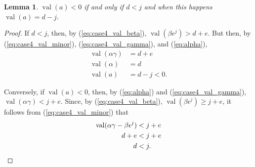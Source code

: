 \documentclass{amsart}
\newtheorem{lemma}{Lemma}[subsection]
\theoremstyle{definition}
\def\e{\epsilon}
\def\val{\mathop{\mathrm{val}}}
\begin{document}
  \begin{lemma}
    \label{lemma:case4_val_a}
    $\val(a) < 0$ if and only if $d < j$ and when this happens $\val(a) = d -
    j$.
  \end{lemma}
  \begin{proof}
    If $d < j$, then, by (\ref{eq:case4_val_beta}), $\val(\beta e^j) > d + e$.
    But then, by (\ref{eq:case4_val_minor}), (\ref{eq:case4_val_gamma}), and
    (\ref{eq:alpha}),
    \begin{align*}
      \val(\alpha\gamma) &= d + e \\
      \val(\alpha) &= d \\
      \val(a) &= d - j < 0.
    \end{align*}

    Conversely, if $\val(a) < 0$, then, by (\ref{eq:alpha}) and
    (\ref{eq:case4_val_gamma}), $\val(\alpha\gamma) < j + e$.  Since, by
    (\ref{eq:case4_val_beta}), $\val(\beta \e^j) \ge j + e$, it follows from
    (\ref{eq:case4_val_minor}) that
    \begin{align*}
      \val(\alpha\gamma - \beta\e^j) &< j + e \\
      d + e &< j + e \\
      d &< j.  \qedhere
    \end{align*}
  \end{proof}
\end{document}
